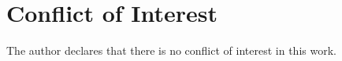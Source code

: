 \section*{Conflict of Interest}

    The author declares that there is no conflict of interest in this work.


